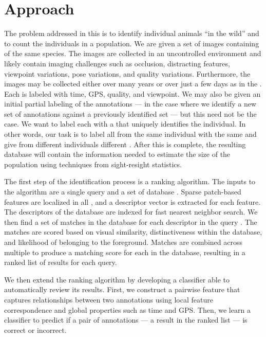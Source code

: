 \section{Approach}
    The problem addressed in this \thesis{} is to identify individual animals ``in the wild'' and to count the
      individuals in a population.
    We are given a set of images containing \annots{} of the same species.
    The images are collected in an uncontrolled environment and likely contain imaging challenges such as
      occlusion, distracting features, viewpoint variations, pose variations, and quality variations.
    Furthermore, the images may be collected either over many years or over just a few days as in the \GZC{}.
    Each \annot{} is labeled with time, GPS, quality, and viewpoint.
    We may also be given an initial partial \name{} labeling of the annotations --- \eg{} in the case where we
      identify a new set of annotations against a previously identified set --- but this need not be the case.
    We want to label each \annot{} with a \glossterm{\name{}} that uniquely identifies the individual.
    In other words, our task is to label all \annots{} from the same individual with the same \name{} and give
      \annots{} from different individuals different \names{}.
    After this is complete, the resulting database will contain the information needed to estimate the size of
      the population using techniques from sight-resight statistics.

    The first step of the identification process is a ranking algorithm. The inputs to the algorithm are a single query
    \annot{} and a set of database \annots{}. Sparse patch-based features are localized in all \annots{}, and a
    descriptor vector is extracted for each feature. The descriptors of the database \annots{} are indexed for fast
    nearest neighbor search. We then find a set of matches in the database for each descriptor in the query \annot{}.
    The matches are scored based on visual similarity, distinctiveness within the database, and likelihood of belonging
    to the foreground. Matches are combined across multiple \exemplar{} \annots{} to produce a matching score for each
    \name{} in the database, resulting in a ranked list of results for each query.

    We then extend the ranking algorithm by developing a classifier able to automatically review its results.
    First, we construct a pairwise feature that captures relationships between two annotations using local
      feature correspondence and global properties such as time and GPS.
    Then, we learn a classifier to predict if a pair of annotations --- \ie{} a result in the ranked list --- is
      correct or incorrect.

